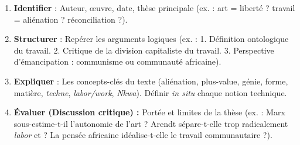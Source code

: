 \documentclass[11pt]{article}
\begin{document}
\begin{methode}
\begin{enumerate}
\item \textbf{Identifier} : Auteur, œuvre, date, thèse principale (ex. : art = liberté ? travail = aliénation ? réconciliation ?).
\item \textbf{Structurer} : Repérer les arguments logiques (ex. : 1. Définition ontologique du travail. 2. Critique de la division capitaliste du travail. 3. Perspective d'émancipation : communisme ou communauté africaine).
\item \textbf{Expliquer} : Les concepts-clés du texte (aliénation, plus-value, génie, forme, matière, \emph{techne}, \emph{labor/work}, \emph{Nkwa}). Définir \emph{in situ} chaque notion technique.
\item \textbf{Évaluer (Discussion critique) :} Portée et limites de la thèse (ex. : Marx sous-estime-t-il l'autonomie de l'art ? Arendt sépare-t-elle trop radicalement \emph{labor} et  ? La pensée africaine idéalise-t-elle le travail communautaire ?).
\end{enumerate}
\end{methode}
\end{document}
